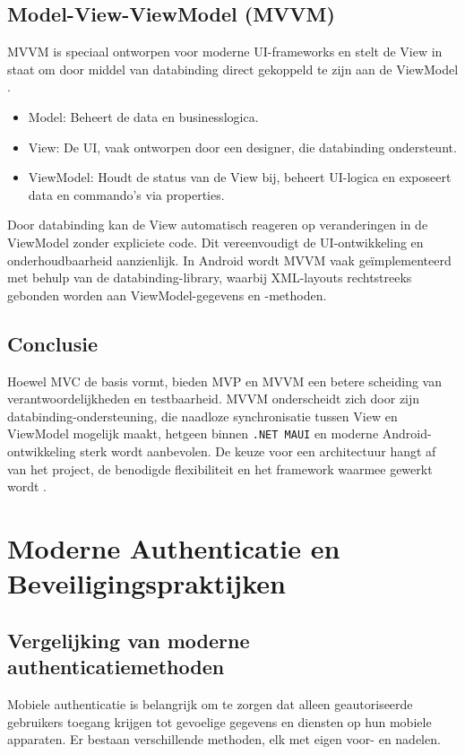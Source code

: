\subsection{Model-View-ViewModel (MVVM)}
MVVM is speciaal ontworpen voor moderne UI-frameworks en stelt de View in staat om door middel van databinding direct gekoppeld te zijn aan de ViewModel \autocite{Lou2016}.  
\begin{itemize}
	\item Model: Beheert de data en businesslogica.  
	\item View: De UI, vaak ontworpen door een designer, die databinding ondersteunt.  
	\item ViewModel: Houdt de status van de View bij, beheert UI-logica en exposeert data en commando’s via properties.  
\end{itemize}

Door databinding kan de View automatisch reageren op veranderingen in de ViewModel zonder expliciete code. Dit vereenvoudigt de UI-ontwikkeling en onderhoudbaarheid aanzienlijk. In Android wordt MVVM vaak geïmplementeerd met behulp van de databinding-library, waarbij XML-layouts rechtstreeks gebonden worden aan ViewModel-gegevens en -methoden.

\subsection{Conclusie}
Hoewel MVC de basis vormt, bieden MVP en MVVM een betere scheiding van verantwoordelijkheden en testbaarheid. MVVM onderscheidt zich door zijn databinding-ondersteuning, die naadloze synchronisatie tussen View en ViewModel mogelijk maakt, hetgeen binnen \texttt{.NET MAUI} en moderne Android-ontwikkeling sterk wordt aanbevolen. De keuze voor een architectuur hangt af van het project, de benodigde flexibiliteit en het framework waarmee gewerkt wordt \autocite{Lou2016}.


\section{Moderne Authenticatie en Beveiligingspraktijken}

\subsection{Vergelijking van moderne authenticatiemethoden}

Mobiele authenticatie is belangrijk om te zorgen dat alleen geautoriseerde gebruikers toegang krijgen tot gevoelige gegevens en diensten op hun mobiele apparaten. Er bestaan verschillende methoden, elk met eigen voor- en nadelen.\\

